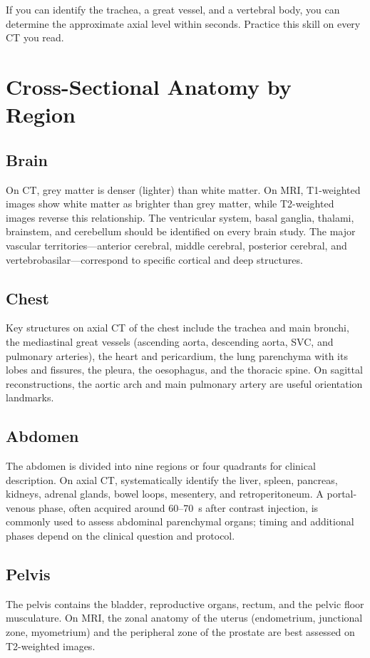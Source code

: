 \begin{pearlbox}
If you can identify the trachea, a great vessel, and a vertebral body, you can determine the approximate axial level within seconds. Practice this skill on every CT you read.
\end{pearlbox}

\section{Cross-Sectional Anatomy by Region}

\subsection{Brain}
On CT, grey matter is denser (lighter) than white matter. On MRI, T1-weighted images show white matter as brighter than grey matter, while T2-weighted images reverse this relationship. The ventricular system, basal ganglia, thalami, brainstem, and cerebellum should be identified on every brain study. The major vascular territories---anterior cerebral, middle cerebral, posterior cerebral, and vertebrobasilar---correspond to specific cortical and deep structures.

\subsection{Chest}
Key structures on axial CT of the chest include the trachea and main bronchi, the mediastinal great vessels (ascending aorta, descending aorta, SVC, and pulmonary arteries), the heart and pericardium, the lung parenchyma with its lobes and fissures, the pleura, the oesophagus, and the thoracic spine. On sagittal reconstructions, the aortic arch and main pulmonary artery are useful orientation landmarks.

\subsection{Abdomen}
The abdomen is divided into nine regions or four quadrants for clinical description. On axial CT, systematically identify the liver, spleen, pancreas, kidneys, adrenal glands, bowel loops, mesentery, and retroperitoneum. A portal-venous phase, often acquired around 60--70~s after contrast injection, is commonly used to assess abdominal parenchymal organs; timing and additional phases depend on the clinical question and protocol.

\subsection{Pelvis}
The pelvis contains the bladder, reproductive organs, rectum, and the pelvic floor musculature. On MRI, the zonal anatomy of the uterus (endometrium, junctional zone, myometrium) and the peripheral zone of the prostate are best assessed on T2-weighted images.

